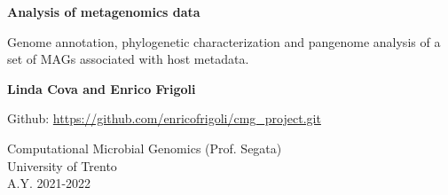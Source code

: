 \begin{titlepage}
    \begin{center}
        \vspace*{1cm}
        
        \Huge
        \textbf{Analysis of metagenomics data}
        
        \vspace{0.5cm}
        \LARGE
        Genome annotation, phylogenetic characterization and pangenome analysis of
        a set of MAGs associated with host metadata.
        
        
        \vfill

        \Large
        
        \textbf{Linda Cova and Enrico Frigoli}
        
        \vspace{1cm}
        
        Github: \href{https://github.com/enricofrigoli/cmg_project.git}{https://github.com/enricofrigoli/cmg\_project.git}
        
        \vspace{0.8cm}
        
        
        \Large
        Computational Microbial Genomics (Prof. Segata) \\
        University of Trento \\
        A.Y. 2021-2022

        
    \end{center}

\end{titlepage}
